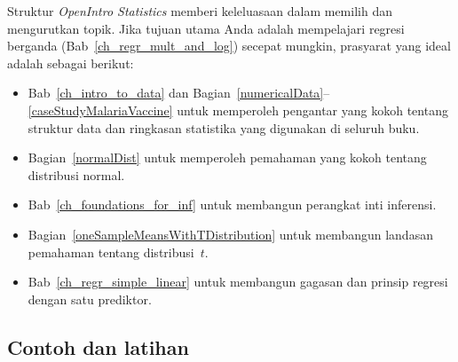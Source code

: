 \noindent%
Struktur \emph{OpenIntro Statistics} memberi keleluasaan
dalam memilih dan mengurutkan topik.
Jika tujuan utama Anda adalah mempelajari regresi berganda
(Bab~\ref{ch_regr_mult_and_log})
secepat mungkin, prasyarat yang ideal adalah sebagai berikut:
\begin{itemize}
\setlength{\itemsep}{0mm}
\item Bab~\ref{ch_intro_to_data} dan
    Bagian~\ref{numericalData}--\ref{caseStudyMalariaVaccine}
    untuk memperoleh
    pengantar yang kokoh tentang struktur data dan ringkasan
    statistika yang digunakan di seluruh buku.
\item Bagian~\ref{normalDist}
    untuk memperoleh pemahaman yang kokoh tentang distribusi normal.
\item Bab~\ref{ch_foundations_for_inf}
    untuk membangun perangkat inti inferensi.
%    
%    
\item Bagian~\ref{oneSampleMeansWithTDistribution}
    untuk membangun landasan pemahaman tentang distribusi~$t$.
\item Bab~\ref{ch_regr_simple_linear}
    untuk membangun gagasan dan prinsip regresi
    dengan satu prediktor.
\end{itemize}


\subsection*{{\color{oiB}Contoh dan latihan}}

